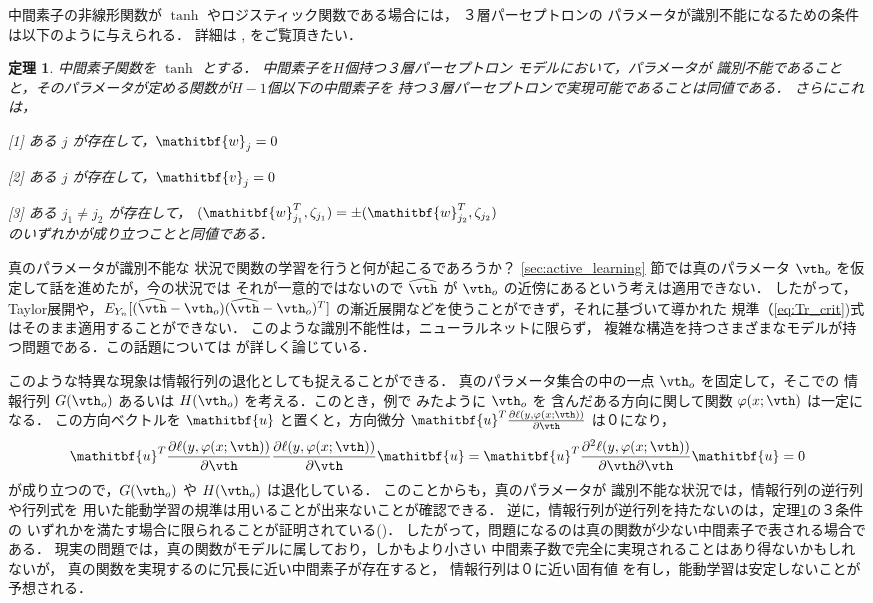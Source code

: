 \documentclass[master]{cimt}
\newtheorem{thm}{定理}
\newcommand{\parder}[2]{\frac{\partial #1}{\partial #2}}
\newcommand{\hvth}{\widehat{{\vth}}}
\newcommand{\vv}{\mathitbf{v}}
\newcommand{\vw}{\mathitbf{w}}
\newcommand{\vu}{\mathitbf{u}}
\begin{document}
中間素子の非線形関数が $\tanh$ やロジスティック関数である場合には，
３層パーセプトロンの
パラメータが識別不能になるための条件は以下のように与えられる．
詳細は \cite{Sussmann}, 
\cite{localmin} をご覧頂きたい．
\begin{thm}
\label{thm:unident_mlp}
中間素子関数を $\tanh$ とする．
中間素子を$H$個持つ３層パーセプトロン
モデルにおいて，パラメータが
識別不能であることと，そのパラメータが定める関数が$H-1$個以下の中間素子を
持つ３層パーセプトロンで実現可能であることは同値である．
さらにこれは，\par
{\rm [1]} ある $j$ が存在して，$\vw_j = 0$ \par
{\rm [2]} ある $j$ が存在して，$\vv_j = 0$ \par
{\rm [3]} ある $j_1 \neq j_2$ が存在して，
$(\vw_{j_1}^T,\zeta_{j_1}) = \pm(\vw_{j_2}^T,\zeta_{j_2})$ \\
のいずれかが成り立つことと同値である．
\end{thm}

真のパラメータが識別不能な
状況で関数の学習を行うと何が起こるであろうか？ \ref{sec:active_learning}
節では真のパラメータ $\vth_o$ を仮定して話を進めたが，今の状況では
それが一意的ではないので
 $\hvth$ が $\vth_o$ の近傍にあるという考えは適用できない．
したがって，Taylor展開や，$E_{Y_n}[ (\hvth - \vth_o)(\hvth - \vth_o)^T]$ 
の漸近展開などを使うことができず，それに基づいて導かれた
規準（\ref{eq:Tr_crit})式はそのまま適用することができない．
このような識別不能性は，ニューラルネットに限らず，
複雑な構造を持つさまざまなモデルが持つ問題である．この話題については
\cite{IwanamiSingular}が詳しく論じている．

このような特異な現象は情報行列の退化としても捉えることができる．
真のパラメータ集合の中の一点 $\vth_o$ を固定して，そこでの
情報行列 $G(\vth_o)$ あるいは $H(\vth_o)$ を考える．このとき，例で
みたように $\vth_o$ を
含んだある方向に関して関数 $\varphi(x;\vth)$ は一定になる．
この方向ベクトルを
$\vu$ と置くと，方向微分 $\vu^T 
\parder{\ell(y, \varphi(x; \vth)) }{\vth}$ は０になり，
\[
	\vu^T \parder{\ell(y, \varphi(x; \vth)) }{\vth}
	\parder{\ell(y, \varphi(x; \vth)) }{\vth}\vu = 
	\vu^T \frac{\partial^2 \ell(y, \varphi(x; \vth)) }
	{\partial\vth \partial \vth}\vu = 0
\]
が成り立つので，$G(\vth_o)$ や $H(\vth_o)$ は退化している．
このことからも，真のパラメータが
識別不能な状況では，情報行列の逆行列や行列式を
用いた能動学習の規準は用いることが出来ないことが確認できる．
逆に，情報行列が逆行列を持たないのは，定理\ref{thm:unident_mlp}の３条件の
いずれかを満たす場合に限られることが証明されている(\cite{fuku_fisher})．
したがって，問題になるのは真の関数が少ない中間素子で表される場合である．
現実の問題では，真の関数がモデルに属しており，しかもより小さい
中間素子数で完全に実現されることはあり得ないかもしれないが，
真の関数を実現するのに冗長に近い中間素子が存在すると，
情報行列は０に近い固有値
を有し，能動学習は安定しないことが予想される．
\end{document}
